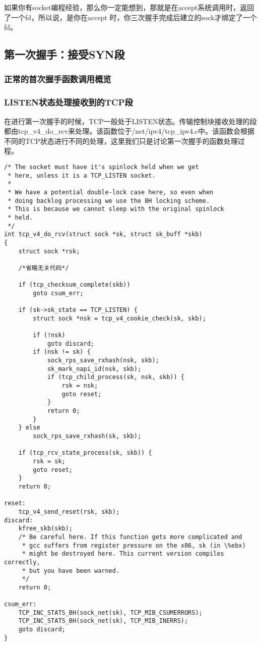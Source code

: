 \documentclass[11pt, a4paper,oneside]{book}
\theoremstyle{ocrenumbox}
\theoremstyle{purplenumbox}
\theoremstyle{blackbox}
\begin{document}
            如果你有socket编程经验，那么你一定能想到，那就是在accept系统调用时，返回了一个fd，所以说，是你在accept 时，你三次握手完成后建立的sock才绑定了一个 fd。
        \subsection{第一次握手：接受SYN段}
			\subsubsection{正常的首次握手函数调用概览}
			            
			\subsubsection{LISTEN状态处理接收到的TCP段}
                在进行第一次握手的时候，TCP一般处于LISTEN状态。传输控制块接收处理的段都由tcp\_v4\_do\_rcv来处理。该函数位于/net/ipv4/tcp\_ipv4.c中。该函数会根据不同的TCP状态进行不同的处理，这里我们只是讨论第一次握手的函数处理过程。
\begin{verbatim}
/* The socket must have it's spinlock held when we get
 * here, unless it is a TCP_LISTEN socket.
 *
 * We have a potential double-lock case here, so even when
 * doing backlog processing we use the BH locking scheme.
 * This is because we cannot sleep with the original spinlock
 * held.
 */
int tcp_v4_do_rcv(struct sock *sk, struct sk_buff *skb)
{
	struct sock *rsk;

	/*省略无关代码*/

	if (tcp_checksum_complete(skb))
		goto csum_err;

	if (sk->sk_state == TCP_LISTEN) {
		struct sock *nsk = tcp_v4_cookie_check(sk, skb);

		if (!nsk)
			goto discard;
		if (nsk != sk) {
			sock_rps_save_rxhash(nsk, skb);
			sk_mark_napi_id(nsk, skb);
			if (tcp_child_process(sk, nsk, skb)) {
				rsk = nsk;
				goto reset;
			}
			return 0;
		}
	} else
		sock_rps_save_rxhash(sk, skb);

	if (tcp_rcv_state_process(sk, skb)) {
		rsk = sk;
		goto reset;
	}
	return 0;

reset:
	tcp_v4_send_reset(rsk, skb);
discard:
	kfree_skb(skb);
	/* Be careful here. If this function gets more complicated and
	 * gcc suffers from register pressure on the x86, sk (in \%ebx)
	 * might be destroyed here. This current version compiles correctly,
	 * but you have been warned.
	 */
	return 0;

csum_err:
	TCP_INC_STATS_BH(sock_net(sk), TCP_MIB_CSUMERRORS);
	TCP_INC_STATS_BH(sock_net(sk), TCP_MIB_INERRS);
	goto discard;
}
\end{verbatim}
\end{document}
